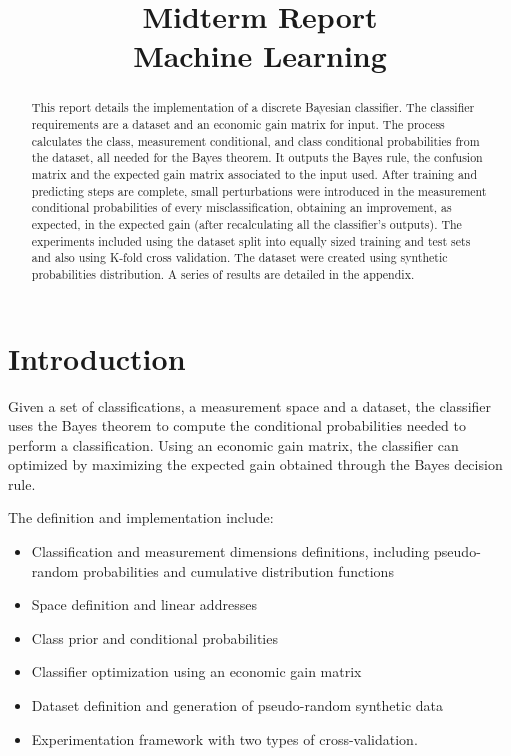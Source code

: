 \documentclass[letterpaper, conference]{IEEEtran}
\begin{document}
\title{Midterm Report \\
  \large Machine Learning}

\author{
}

\maketitle

\begin{abstract}

This report details the implementation of a discrete Bayesian classifier. The classifier requirements are a dataset and an economic gain matrix for input. The process calculates the class, measurement conditional, and class conditional probabilities from the dataset, all needed for the Bayes theorem. It outputs the Bayes rule, the confusion matrix and the expected gain matrix associated to the input used. After training  and predicting steps are complete, small perturbations were introduced in the measurement conditional probabilities of every misclassification, obtaining an improvement, as expected, in the expected gain (after recalculating all the classifier's outputs). The experiments included using the dataset split into equally sized  training and test sets and also using K-fold cross validation. The dataset were created using synthetic probabilities distribution. A series of results are detailed in the appendix.

\end{abstract}

\section{Introduction}

Given a set of classifications, a measurement space and a dataset, the classifier uses the Bayes theorem to compute the conditional probabilities needed to perform a classification. Using an economic gain matrix, the classifier can optimized by maximizing the expected gain obtained through the Bayes decision rule.

The definition and implementation include:

\begin{itemize}
  \item Classification and measurement dimensions definitions, including pseudo-random probabilities and cumulative distribution functions
  \item Space definition and linear addresses
  \item Class prior and conditional probabilities
  \item Classifier optimization using an economic gain matrix
  \item Dataset definition and generation of pseudo-random synthetic data
  \item Experimentation framework with two types of cross-validation.
\end{itemize}
\end{document}
